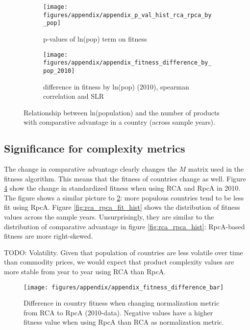 \documentclass[11pt]{article}
\begin{document}
\begin{appendices}
\begin{figure}
     \centering
     \begin{subfigure}[b]{0.45\textwidth}
         \centering
         \texttt{[image: figures/appendix/appendix\_p\_val\_hist\_rca\_rpca\_by\_pop]}
         \caption{p-values of ln(pop) term on fitness}
         \label{fig:p_val_hist_pop}
     \end{subfigure}
     \hfill
     \begin{subfigure}[b]{0.45\textwidth}
       \centering
         \texttt{[image: figures/appendix/appendix\_fitness\_difference\_by\_pop\_2010]}
         \caption{difference in fitness by ln(pop) (2010), spearman correlation and SLR}
         \label{fig:stand_diff_fit_pop}
     \end{subfigure}
	 \caption{Relationship between ln(population) and the number of products with comparative advantage in a country (across sample years).}
        \label{fig:population_difference}
\end{figure}

\subsection{Significance for complexity metrics}
\label{subsec:significance_for_complexity}

The change in comparative advantage clearly changes the $M$ matrix used in the fitness algorithm. This means that the fitness of countries change as well. Figure \ref{fig:bar_plot_diff} show the change in standardized fitness when using RCA and RpcA in 2010. The figure shows a similar picture to \ref{fig:stand_diff_fit_pop}: more populous countries tend to be less fit using RpcA. Figure \ref{fig:rca_rpca_fit_hist} shows the distribution of fitness values across the sample years. Unsurprisingly, they are similar to the distribution of comparative advantage in figure \ref{fig:rca_rpca_hist}: RpcA-based fitness are more right-skewed.

TODO: Volatility. Given that population of countries are less volatile over time than commodity prices, we would expect that product complexity values are more stable from year to year using RCA than RpcA.
\begin{figure}[ht]
  \centering
  \texttt{[image: figures/appendix/appendix\_fitness\_difference\_bar]}
  \caption{Difference in country fitness when changing normalization metric from RCA to RpcA (2010-data). Negative values have a higher fitness value when using RpcA than RCA as normalization metric.}
  \label{fig:bar_plot_diff}
\end{figure}


\end{appendices}
\end{document}
